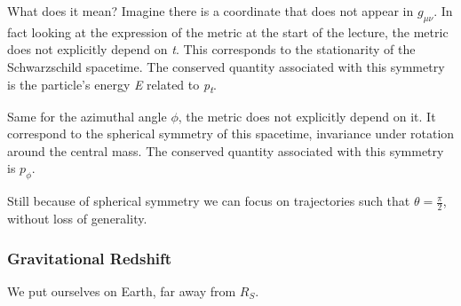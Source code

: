 What does it mean? Imagine there is a coordinate that does not appear in $g_{\mu \nu }$.
In fact looking at the expression of the metric at the start of the lecture, the metric does not explicitly depend on \emph{t}. This corresponds to the stationarity of the Schwarzschild spacetime. The conserved quantity associated with this symmetry is the particle's energy \emph{E} related to \emph{p\textsubscript{t}}.\par
Same for the azimuthal angle $\phi $, the metric does not explicitly depend on it. It correspond to the spherical symmetry of this spacetime, invariance under rotation around the central mass. The conserved quantity associated with this symmetry is $p_{\phi }$.\par
Still because of spherical symmetry we can focus on trajectories such that $\theta  = \frac{\pi }{2}$, without loss of generality.

\subsubsection{Gravitational Redshift}
We put ourselves on Earth, far away from $R_{S}$.
\bigskip



